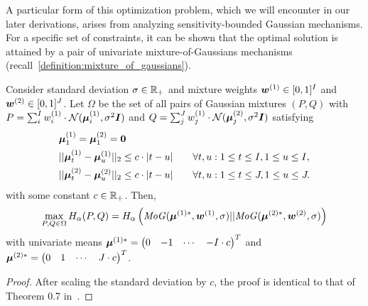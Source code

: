 A particular form of this optimization problem, which we will encounter in our later derivations, arises from analyzing sensitivity-bounded Gaussian mechanisms. For a specific set of constraints, it can be shown that the optimal solution is attained by a pair of univariate mixture-of-Gaussians mechanisms (recall~\cref{definition:mixture_of_gaussians}).
\begin{lemma}\label{lemma:worst_case_insertion_removal_mixture}
    Consider standard deviation $\sigma \in {\mathbb{R}}_+$ and mixture weights ${\bm{w}}^{(1)} \in [0,1]^I$ and ${\bm{w}}^{(2)} \in [0,1]^J$. 
    Let $\Omega$ be the set of all pairs of Gaussian mixtures $(P,Q)$
    with 
    $P = \sum_{i}^{I} w^{(1)}_i \cdot \mathcal{N}({\bm{\mu}}^{(1)}_{i}, \sigma^2 {\bm{I}})$
    and
    $Q = \sum_{j}^{J} w^{(1)}_j \cdot \mathcal{N}({\bm{\mu}}^{(2)}_{j}, \sigma^2 {\bm{I}})$
    satisfying
    \begin{align*}
        & {\bm{\mu}}^{(1)}_1 = {\bm{\mu}}^{(2)}_1 =  {\bm{0}}\\
        & ||{\bm{\mu}}^{(1)}_t - {\bm{\mu}}^{(1)}_u||_2 \leq c \cdot | t - u |   \qquad \forall t,u : 1 \leq t \leq I, 1 \leq u \leq I, \\
        & ||{\bm{\mu}}^{(2)}_t - {\bm{\mu}}^{(2)}_u||_2 \leq c \cdot | t - u |   \qquad \forall t,u : 1 \leq t \leq J, 1 \leq u \leq J.
    \end{align*}
    with some constant $c \in {\mathbb{R}}_+$. Then,
    \begin{equation*}
        \max_{P, Q \in \Omega} H_\alpha(P,Q) = H_\alpha\left(\mathit{MoG}({\bm{\mu}}^{(1)*}, {\bm{w}}^{(1)}, \sigma) || \mathit{MoG}({\bm{\mu}}^{(2)*}, {\bm{w}}^{(2)}, \sigma)\right)
    \end{equation*}
    with univariate means ${\bm{\mu}}^{(1)*} = \begin{pmatrix}0 & -1 & \cdots & -I \cdot c\end{pmatrix}^T$ and
    ${\bm{\mu}}^{(2)*} = \begin{pmatrix}0 & 1 & \cdots & J \cdot c\end{pmatrix}^T$.
\end{lemma}
\begin{proof}
    After scaling the standard deviation by $c$, the proof is identical to that of Theorem 0.7 in~\cite{schuchardt2024unified}.
\end{proof}

